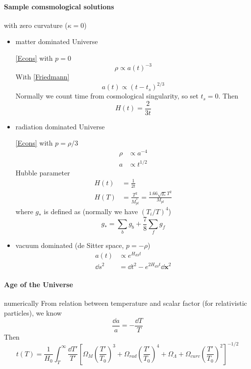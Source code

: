 \documentclass[12pt, a4paper, DIV=15]{article}
\numberwithin{equation}{section}
\begin{document}
\paragraph{Sample comsmological solutions} with zero curvature ($\kappa = 0$)
\begin{itemize}
   \item matter dominated Universe 

      \eqref{Econs} with $p=0$ 
      \begin{equation}
         \rho \propto a(t)^{-3}
      \end{equation}
      With \eqref{Friedmann}
      \begin{equation}
         a(t) \propto (t-t_s)^{2/3}
      \end{equation}
      Normally we count time from cosmological singularity, so set $t_s = 0$. Then
      \begin{equation}
         H(t) = \frac{2}{3t}
      \end{equation}

   \item radiation dominated Universe
      
      \eqref{Econs} with $p=\rho/3$
      \begin{align}
         \rho &\propto a^{-4} \\
         a &\propto t^{1/2}
      \end{align}
      Hubble parameter
      \begin{align}
         H(t) &= \frac{1}{2t} \\
         H(T) &= \frac{T^2}{M^*_{pl}} = \frac{1.66 \sqrt{g_*}T^2}{M_{pl}}
      \end{align}
      where $g_*$ is defined as (normally we have $(T_i/T)^4$)
      \begin{equation}
         g_* = \sum_b g_b + \frac{7}{8} \sum_f g_f
      \end{equation}

   \item vacuum dominated (de Sitter space, $p = -\rho$)
         \begin{align}
            a(t) &\propto e^{H_{dS} t} \\
            \dd{s^2} &= \dd{t^2} - e^{2H_{dS}t} \dd{\pmb{x}^2}
         \end{align}

\end{itemize}

\paragraph{Age of the Universe} numerically
From relation between temperature and scalar factor (for relativistic particles), we know
\begin{equation}
   \frac{\dd{a}}{a} = - \frac{\dd{T}}{T} 
\end{equation}
Then
\begin{equation}
   t(T) = \frac{1}{H_0} \int_T^\infty \frac{\dd{T'}}{T'} \left[ \Omega_M \left( \frac{T'}{T_0} \right)^3 + \Omega_{rad} \left( \frac{T'}{T_0} \right)^4 + \Omega_{\Lambda} + \Omega_{curv} \left( \frac{T'}{T_0} \right)^2 \right]^{-1/2}
\end{equation}
\end{document}
